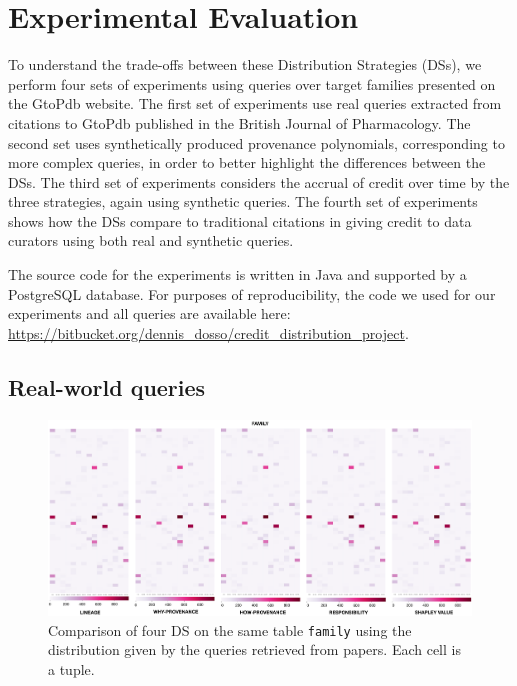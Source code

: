 \section{Experimental Evaluation}
\label{sec:experiments}
To understand the trade-offs between these Distribution Strategies (DSs), we perform four sets of experiments using queries over target families presented on the GtoPdb website. The first set of experiments use real queries extracted from citations to GtoPdb published in the British Journal of Pharmacology.  
The second set uses synthetically produced provenance polynomials, corresponding to more complex queries, in order to better highlight the differences between the DSs.
The third set of experiments considers the accrual of credit over time by the three strategies, again using synthetic queries.
The fourth set of experiments shows how the DSs compare to traditional citations in giving credit to data curators using both real and synthetic queries.

The source code for the experiments is written in Java and supported by a PostgreSQL database. For purposes of reproducibility, the code we used for our experiments and all queries are available here: \url{https://bitbucket.org/dennis_dosso/credit_distribution_project}.

\subsection{Real-world queries}
\label{sec:real_world_queries}

\begin{figure}[t]
\centering
  \includegraphics[width=\textwidth]{figures/paper_based}
  \caption{Comparison of four DS on the same table \texttt{family} using the distribution given by the queries retrieved from papers. Each cell is a tuple.}
  \label{figure:comparison_on_papers}
\end{figure}


